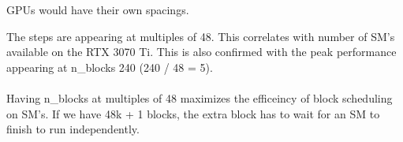 \documentclass{article}
\newenvironment{answer}
{\par\color{blue}}
{\normalfont\par}
\begin{document}
\begin{enumerate}
\begin{enumerate}
\begin{itemize}
                              GPUs would have their own spacings.
                    \end{itemize}
                    \begin{answer}
                        The steps are appearing at multiples of 48. This correlates with number of SM's available
                        on the RTX 3070 Ti. This is also confirmed with the peak performance appearing at n\_blocks 240 (240 / 48 = 5). \\
                        \\
                        Having n\_blocks at multiples of 48 maximizes the efficeincy of block scheduling on SM's. If we have 48k + 1 blocks,
                        the extra block has to wait for an SM to finish to run independently.
                    \end{answer}


\end{enumerate}
\end{enumerate}
\end{document}
